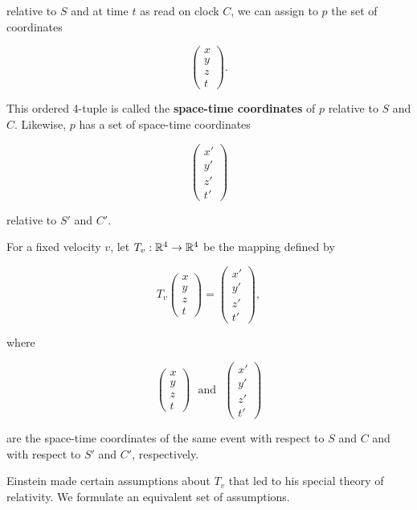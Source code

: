 \begin{definition}
	relative to $S$ and at time $t$ as read on clock $C$, we can assign to $p$ the set of coordinates

	\[\begin{pmatrix} x \\ y \\ z \\ t \end{pmatrix}.\]

	This ordered 4-tuple is called the \textbf{space-time coordinates} of $p$ relative to $S$ and $C$. Likewise, $p$ has a set of space-time coordinates

	\[\begin{pmatrix} x' \\ y' \\ z' \\ t' \end{pmatrix}\]

	relative to $S'$ and $C'$.

	For a fixed velocity $v$, let $T_v: \mathbb{R}^4 \to \mathbb{R}^4$ be the mapping defined by

	\[T_v \begin{pmatrix}x \\ y \\ z \\ t \end{pmatrix} = \begin{pmatrix} x' \\ y' \\ z' \\ t' \end{pmatrix},\]

	where

	\[\begin{pmatrix}x \\ y \\ z \\ t \end{pmatrix}\ \ \ \text{and}\ \ \ \begin{pmatrix} x' \\ y' \\ z' \\ t' \end{pmatrix}\]

	are the space-time coordinates of the same event with respect to $S$ and $C$ and with respect to $S'$ and $C'$, respectively.

	Einstein made certain assumptions about $T_v$ that led to his special theory of relativity. We formulate an equivalent set of assumptions.


\end{definition}
